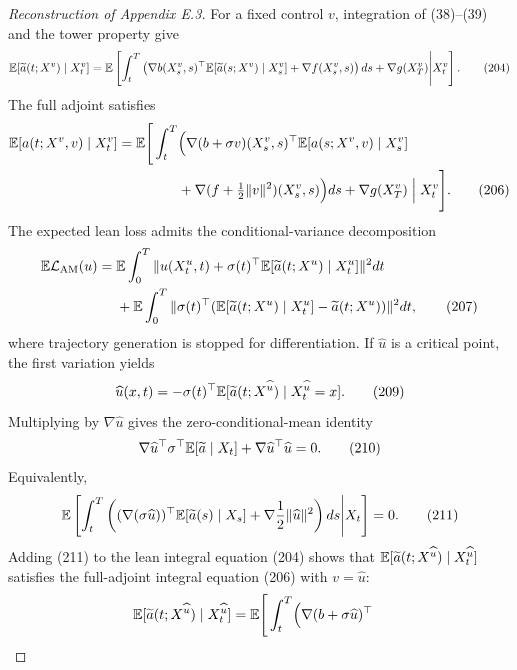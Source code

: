 \begin{proof}[Reconstruction of Appendix E.3]
For a fixed control $v$, integration of (38)--(39) and the tower property give
\begin{equation*}
 \mathbb{E}[\widetilde a(t;X^v)\mid X_t^v]
 =\mathbb{E}\left[
 \int_t^T
 \left(\nabla b(X_s^v,s)^\top
 \mathbb{E}[\widetilde a(s;X^v)\mid X_s^v]
 +\nabla f(X_s^v,s)
 \right)ds
 +\nabla g(X_T^v)
 \middle|X_t^v
 \right].
 \tag{204}
\end{equation*}
The full adjoint satisfies
\begin{align*}
 \mathbb{E}[a(t;X^v,v)\mid X_t^v]
 =\mathbb{E}\Bigg[\int_t^T
 &\Big(
 \nabla(b+\sigma v)(X_s^v,s)^\top
 \mathbb{E}[a(s;X^v,v)\mid X_s^v]\\
 &+\nabla(f+\tfrac12\|v\|^2)(X_s^v,s)
 \Big)ds+\nabla g(X_T^v)
 \Bigm|X_t^v\Bigg].
 \tag{206}
\end{align*}
The expected lean loss admits the conditional-variance decomposition
\begin{align*}
 \mathbb{E}\mathcal L_{\mathrm{AM}}(u)
 ={}&\mathbb{E}\int_0^T
 \|u(X_t^u,t)+\sigma(t)^\top
 \mathbb{E}[\widetilde a(t;X^u)\mid X_t^u]\|^2dt\\
 &+\mathbb{E}\int_0^T
 \|\sigma(t)^\top(
 \mathbb{E}[\widetilde a(t;X^u)\mid X_t^u]-\widetilde a(t;X^u))\|^2dt,
 \tag{207}
\end{align*}
where trajectory generation is stopped for differentiation.  If $\widehat u$ is a critical point, the first variation yields
\begin{equation*}
 \widehat u(x,t)
 =-\sigma(t)^\top
 \mathbb{E}[\widetilde a(t;X^{\widehat u})\mid X_t^{\widehat u}=x].
 \tag{209}
\end{equation*}
Multiplying by $\nabla\widehat u$ gives the zero-conditional-mean identity
\begin{equation*}
 \nabla\widehat u^\top\sigma^\top
 \mathbb{E}[\widetilde a\mid X_t]
 +\nabla\widehat u^\top\widehat u=0.
 \tag{210}
\end{equation*}
Equivalently,
\begin{equation*}
 \mathbb{E}\left[
 \int_t^T
 \left(
 (\nabla(\sigma\widehat u))^\top
 \mathbb{E}[\widetilde a(s)\mid X_s]
 +\nabla\frac12\|\widehat u\|^2
 \right)ds
 \middle|X_t
 \right]=0.
 \tag{211}
\end{equation*}
Adding (211) to the lean integral equation (204) shows that
$\mathbb{E}[\widetilde a(t;X^{\widehat u})\mid X_t^{\widehat u}]$ satisfies the full-adjoint integral equation (206) with $v=\widehat u$:
\begin{align*}
 \E[\widetilde a(t;X^{\widehat u})\mid X_t^{\widehat u}]
 =\E\Bigg[\int_t^T
 &\Big(
 \nabla(b+\sigma\widehat u)^\top

\end{align*}
\end{proof}
